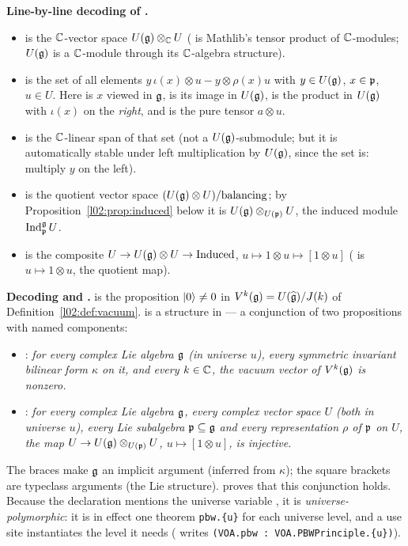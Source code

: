\begin{dictionary}
\textbf{Line-by-line decoding of .}
\begin{itemize}
\item {} is the ${\mathbb{C}}$-vector space $U(\mathfrak{g})\otimes_{\mathbb{C}} U$ ( is Mathlib's
  tensor product of ${\mathbb{C}}$-modules; $U(\mathfrak{g})$ is a ${\mathbb{C}}$-module through its ${\mathbb{C}}$-algebra structure).
\item {} is the set of all elements $y\,\iota(x)\otimes u - y\otimes\rho(x)u$
  with $y\in U(\mathfrak{g})$, $x\in\mathfrak{p}$, $u\in U$. Here  is $x$ viewed in $\mathfrak{g}$,
   is its image in $U(\mathfrak{g})$,  is the
  product in $U(\mathfrak{g})$ with $\iota(x)$ on the \emph{right}, and  is the pure
  tensor $a\otimes u$.
\item {} is the ${\mathbb{C}}$-linear span of that set (not a $U(\mathfrak{g})$-submodule; but it is
  automatically stable under left multiplication by $U(\mathfrak{g})$, since the set is: multiply $y$ on the
  left).
\item {} is the quotient vector space $(U(\mathfrak{g})\otimes U)/\text{balancing}$; by
  Proposition~\ref{l02:prop:induced} below it is $U(\mathfrak{g})\otimes_{U(\mathfrak{p})}U$, the induced module
  $\operatorname{Ind}_{\mathfrak{p}}^{\mathfrak{g}} U$.
\item {} is the composite $U\to U(\mathfrak{g})\otimes U\to\text{Induced}$,
  $u\mapsto 1\otimes u\mapsto[1\otimes u]$ ( is $u\mapsto 1\otimes u$,
   the quotient map).
\end{itemize}
\textbf{Decoding  and .}  is the proposition
$|0\rangle\ne0$ in $V^k(\mathfrak{g}) = U(\widehat{\mathfrak{g}})/J(k)$ of Definition~\ref{l02:def:vacuum}.
 is a structure in  --- a conjunction of two propositions with named
components:
\begin{itemize}
\item[(A)] : \emph{for every complex Lie algebra $\mathfrak{g}$ (in universe $u$), every
  symmetric invariant bilinear form $\kappa$ on it, and every $k\in{\mathbb{C}}$, the vacuum vector of
  $V^k(\mathfrak{g})$ is nonzero.}
\item[(B)] : \emph{for every complex Lie algebra $\mathfrak{g}$, every complex vector space
  $U$ (both in universe $u$), every Lie subalgebra $\mathfrak{p}\subseteq\mathfrak{g}$ and every representation
  $\rho$ of $\mathfrak{p}$ on $U$, the map $U\to U(\mathfrak{g})\otimes_{U(\mathfrak{p})}U$, $u\mapsto[1\otimes u]$, is
  injective.}
\end{itemize}
The braces  make $\mathfrak{g}$ an implicit argument (inferred from $\kappa$); the
square brackets are typeclass arguments (the Lie structure).  proves
that this conjunction holds. Because the declaration mentions the universe variable , it is
\emph{universe-polymorphic}: it is in effect one theorem \texttt{pbw.\{u\}} for each universe level, and a
use site instantiates the level it needs (\allowbreak{} writes
\texttt{(VOA.pbw : VOA.PBWPrinciple.\{u\})}).


\end{dictionary}
